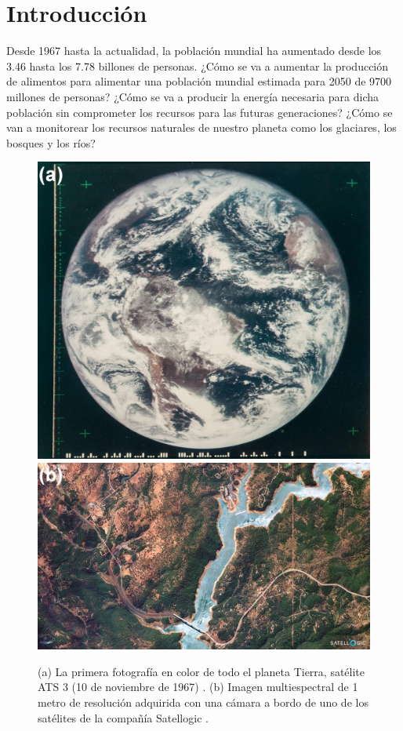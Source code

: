 \singlespacing
\chapter{Introducción}
\label{chap:introd}


\hspace{0.5cm}Desde 1967 hasta la actualidad, la población mundial ha aumentado desde los 3.46 hasta los 7.78 billones de personas. ¿Cómo se va a aumentar la producción de alimentos para alimentar una población mundial estimada para 2050 de 9700 millones de personas? ¿Cómo se va a producir la energía necesaria para dicha población sin comprometer los recursos para las futuras generaciones? ¿Cómo se van a monitorear los recursos naturales de nuestro planeta como los glaciares, los bosques y los ríos?

\begin{figure}[H]
\centering
\includegraphics[scale=0.179]{Figs/introduccion/nasaluna7_0.jpg}\hfill
\includegraphics[scale=0.2]{Figs/introduccion/arbolsat.png}
\caption{(a) La primera fotografía en color de todo el planeta Tierra, satélite ATS 3 (10 de noviembre de 1967)  \cite{nattierrra}. (b) Imagen multiespectral de 1 metro de resolución adquirida con una cámara a bordo de uno de los satélites de la compañía Satellogic \cite{imsatt}.}
\label{figs:tierraysatell}
\end{figure}

